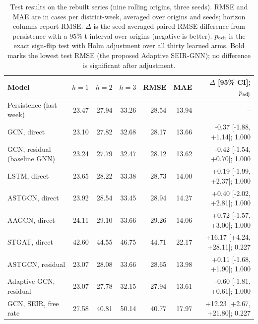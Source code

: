 \begin{table}[t]
\centering
\caption{Test results on the rebuilt series (nine rolling origins, three seeds). RMSE and MAE are in cases per district-week, averaged over origins and seeds; horizon columns report RMSE. $\Delta$ is the seed-averaged paired RMSE difference from persistence with a 95\% t interval over origins (negative is better). $p_{\rm adj}$ is the exact sign-flip test with Holm adjustment over all thirty learned arms. Bold marks the lowest test RMSE (the proposed Adaptive SEIR-GNN); no difference is significant after adjustment.}
\label{tab:main}
\small\setlength{\tabcolsep}{3pt}
\begin{tabular}{@{}p{2.85in}rrrrrr@{}}
\toprule
Model & $h=1$ & $h=2$ & $h=3$ & RMSE & MAE & $\Delta$ [95\% CI]; $p_{\rm adj}$ \\
\midrule
Persistence (last week) & 23.47 & 27.94 & 33.26 & 28.54 & 13.94 & -- \\ %

GCN, direct & 23.10 & 27.82 & 32.68 & 28.17 & 13.66 & -0.37 [-1.88, +1.14]; 1.000 \\ %

GCN, residual (baseline GNN) & 23.24 & 27.79 & 32.47 & 28.12 & 13.62 & -0.42 [-1.54, +0.70]; 1.000 \\ %

LSTM, direct & 23.65 & 28.22 & 33.38 & 28.73 & 14.00 & +0.19 [-1.99, +2.37]; 1.000 \\ %

ASTGCN, direct & 23.92 & 28.54 & 33.45 & 28.94 & 14.27 & +0.40 [-2.02, +2.81]; 1.000 \\ %

AAGCN, direct & 24.11 & 29.10 & 33.66 & 29.26 & 14.06 & +0.72 [-1.57, +3.00]; 1.000 \\ %

STGAT, direct & 42.60 & 44.55 & 46.75 & 44.71 & 22.17 & +16.17 [+4.24, +28.11]; 0.227 \\ %

ASTGCN, residual & 23.07 & 28.08 & 33.66 & 28.65 & 13.98 & +0.11 [-1.68, +1.90]; 1.000 \\ %

Adaptive GCN, residual & 23.07 & 27.78 & 32.15 & 27.94 & 13.61 & -0.60 [-1.81, +0.61]; 1.000 \\ %

GCN, SEIR, free rate & 27.58 & 40.81 & 50.14 & 40.77 & 17.97 & +12.23 [+2.67, +21.80]; 0.227 \\ %


\end{tabular}
\end{table}

